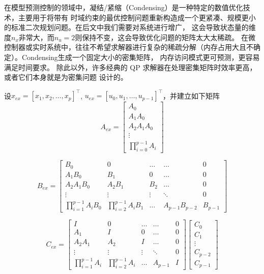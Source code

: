 在模型预测控制的领域中，凝结/紧缩（Condensing）是一种特定的数值优化技术，主要用于将带有
时域约束的最优控制问题重新构造成一个更紧凑、规模更小的标准二次规划问题。在后文中我们需要对系统进行增广，
这会导致状态量的维度$n_x$非常大，而$n_u = 2$则保持不变，这会导致优化问题的矩阵太大太稀疏。
在微控制器或实时系统中，往往不希望求解器进行复杂的稀疏分解（内存占用大且不确定）。Condensing生成一个固定大小的密集矩阵，
内存访问模式更可预测，更容易满足时间要求。 除此以外，许多经典的 QP 求解器在处理密集矩阵时效率更高，或者它们本身就是为密集问题
设计的。

设$x_{ex} = [x_1, x_2, \dots, x_p]^\top$, $u_{ex} = [u_0, u_1, \dots, u_{p-1}]^\top$，并建立如下矩阵
\begin{equation}
    A_{ex} = \begin{bmatrix}A_0\\A_1A_0\\A_2A_1A_0\\ \vdots \\ \prod_{i=0}^{p-1}A_i\end{bmatrix}
\end{equation}

\begin{equation}
    B_{ex} = \begin{bmatrix}B_0&0&\dots&\dots&0\\A_1B_0&B_1&0&\ldots&0\\A_2A_1B_0&A_2B_1&B_2&\ldots&0\\\vdots&\vdots&\vdots&\ddots&0\\\prod_{i=1}^{p-1}A_iB_0&\prod_{i=2}^{p-1}A_iB_1&\ldots&A_{p-1}B_{p-2}&B_{p-1}\end{bmatrix}
\end{equation}

\begin{equation}
    C_{ex} = \begin{bmatrix}I&0&\ldots&\dots&0\\A_1&I&0&\ldots&0\\A_2A_1&A_2&I&\ldots&0\\\vdots&\vdots&\vdots&\ddots&0\\\prod_{i=1}^{p-1}A_i&\prod_{i=2}^{p-1}A_i&\ldots&A_{p-1}&I\end{bmatrix}\begin{bmatrix}C_0\\C_1\\ \vdots \\C_{p-2} \\ C_{p-1}\end{bmatrix}
\end{equation}

